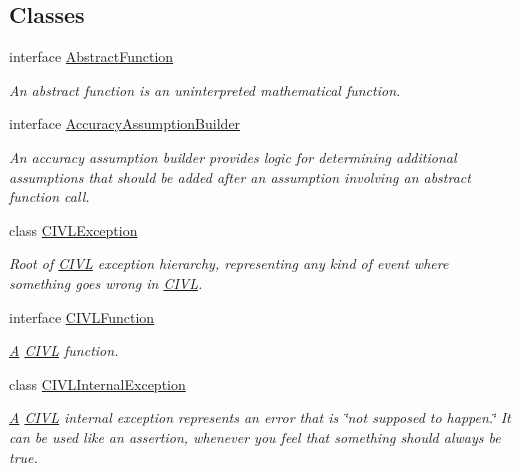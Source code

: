 \subsection*{Classes}
\begin{DoxyCompactItemize}
\item 
interface \hyperlink{interfaceedu_1_1udel_1_1cis_1_1vsl_1_1civl_1_1model_1_1IF_1_1AbstractFunction}{Abstract\+Function}
\begin{DoxyCompactList}\small\item\em An abstract function is an uninterpreted mathematical function. \end{DoxyCompactList}\item 
interface \hyperlink{interfaceedu_1_1udel_1_1cis_1_1vsl_1_1civl_1_1model_1_1IF_1_1AccuracyAssumptionBuilder}{Accuracy\+Assumption\+Builder}
\begin{DoxyCompactList}\small\item\em An accuracy assumption builder provides logic for determining additional assumptions that should be added after an assumption involving an abstract function call. \end{DoxyCompactList}\item 
class \hyperlink{classedu_1_1udel_1_1cis_1_1vsl_1_1civl_1_1model_1_1IF_1_1CIVLException}{C\+I\+V\+L\+Exception}
\begin{DoxyCompactList}\small\item\em Root of \hyperlink{classedu_1_1udel_1_1cis_1_1vsl_1_1civl_1_1CIVL}{C\+I\+V\+L} exception hierarchy, representing any kind of event where something goes wrong in \hyperlink{classedu_1_1udel_1_1cis_1_1vsl_1_1civl_1_1CIVL}{C\+I\+V\+L}. \end{DoxyCompactList}\item 
interface \hyperlink{interfaceedu_1_1udel_1_1cis_1_1vsl_1_1civl_1_1model_1_1IF_1_1CIVLFunction}{C\+I\+V\+L\+Function}
\begin{DoxyCompactList}\small\item\em \hyperlink{structA}{A} \hyperlink{classedu_1_1udel_1_1cis_1_1vsl_1_1civl_1_1CIVL}{C\+I\+V\+L} function. \end{DoxyCompactList}\item 
class \hyperlink{classedu_1_1udel_1_1cis_1_1vsl_1_1civl_1_1model_1_1IF_1_1CIVLInternalException}{C\+I\+V\+L\+Internal\+Exception}
\begin{DoxyCompactList}\small\item\em \hyperlink{structA}{A} \hyperlink{classedu_1_1udel_1_1cis_1_1vsl_1_1civl_1_1CIVL}{C\+I\+V\+L} internal exception represents an error that is \char`\"{}not supposed to happen.\char`\"{} It can be used like an assertion, whenever you feel that something should always be true. \end{DoxyCompactList}\item 

\end{DoxyCompactItemize}
